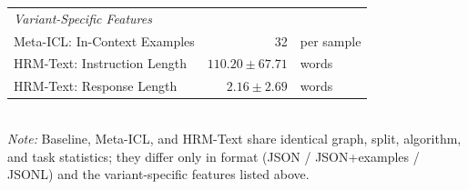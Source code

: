 \begin{table}[h]
\begin{tabular}{lrl}
\midrule
\multicolumn{3}{l}{\textit{Variant-Specific Features}} \\
Meta-ICL: In-Context Examples & 32 & per sample \\
HRM-Text: Instruction Length & $110.20 \pm 67.71$ & words \\
HRM-Text: Response Length & $2.16 \pm 2.69$ & words \\
\bottomrule
\end{tabular}
\\[2pt]
\footnotesize\emph{Note:} Baseline, Meta-ICL, and HRM-Text share identical graph, split, algorithm, and task statistics; they differ only in format (JSON / JSON+examples / JSONL) and the variant-specific features listed above.
\end{table}